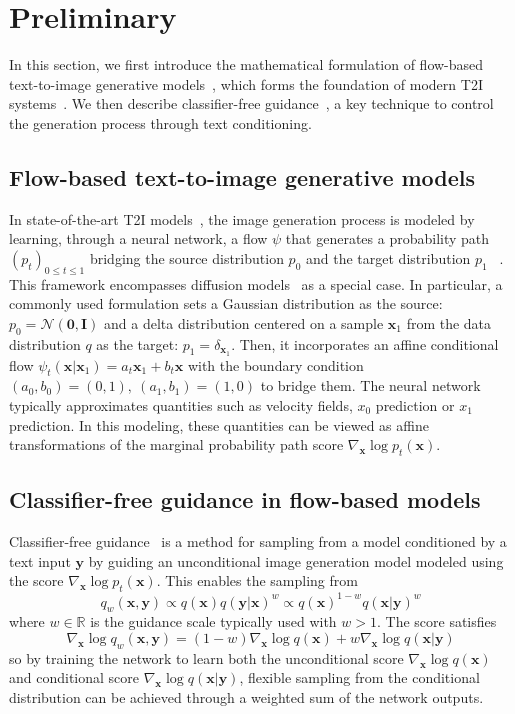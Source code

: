 \section{Preliminary}
\label{sec:preliminary}
In this section, we first introduce the mathematical formulation of flow-based text-to-image generative models~\cite{Xingchao_2022,Lipman_2022}, which forms the foundation of modern T2I systems~\cite{sd3,sdxl,imagen3,imagen}. We then describe classifier-free guidance~\cite{ho2022classifier}, a key technique to control the generation process through text conditioning.

\subsection{Flow-based text-to-image generative models}
In state-of-the-art T2I models~\cite{sd3}, the image generation process is modeled by learning, through a neural network, a flow $\psi$ that generates a probability path $(p_t)_{0\le t\le 1}$ bridging the source distribution $p_0$ and the target distribution $p_1$ ~\cite{Xingchao_2022,Lipman_2022}. This framework encompasses diffusion models~\cite{sohl2015deep,ddpm} as a special case. In particular, a commonly used formulation sets a Gaussian distribution as the source: $p_0 = \mathcal{N}(\mathbf{0}, \mathbf{I})$ and a delta distribution centered on a sample $\mathbf{x}_1$ from the data distribution $q$ as the target: $p_1 = \delta_{\mathbf{x}_1}$.
Then, it incorporates an affine conditional flow $\psi_t(\mathbf{x} | \mathbf{x}_1) = a_t \mathbf{x}_1 + b_t \mathbf{x}$ with the boundary condition $(a_0, b_0) = (0, 1),\ (a_1, b_1) = (1, 0)$ to bridge them. The neural network typically approximates quantities such as velocity fields, $x_0$ prediction or $x_1$ prediction. In this modeling, these quantities can be viewed as affine transformations of the marginal probability path score $\nabla_{\mathbf{x}} \log p_t(\mathbf{x})$.

\subsection{Classifier-free guidance in flow-based models}
Classifier-free guidance~\cite{ho2022classifier} is a method for sampling from a model conditioned by a text input $\mathbf{y}$ by guiding an unconditional image generation model modeled using the score $\nabla_{\mathbf{x}} \log p_t(\mathbf{x})$. This enables the sampling from
\[
q_w(\mathbf{x}, \mathbf{y}) \propto q(\mathbf{x})q(\mathbf{y}|\mathbf{x})^w \propto q(\mathbf{x})^{1-w}q(\mathbf{x}|\mathbf{y})^w
\]
where $w \in \mathbb{R}$ is the guidance scale typically used with $w > 1$. The score satisfies
\[
\nabla_{\mathbf{x}} \log q_w(\mathbf{x}, \mathbf{y}) = (1-w)\nabla_{\mathbf{x}} \log q(\mathbf{x}) + w\nabla_{\mathbf{x}} \log q(\mathbf{x}|\mathbf{y})
\]
so by training the network to learn both the unconditional score $\nabla_{\mathbf{x}} \log q(\mathbf{x})$ and conditional score $\nabla_{\mathbf{x}} \log q(\mathbf{x}|\mathbf{y})$, flexible sampling from the conditional distribution can be achieved through a weighted sum of the network outputs.